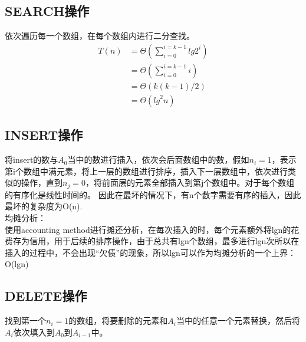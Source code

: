 \documentclass[UTF8]{ctexart}
\begin{document}
\subsection{SEARCH操作}
依次遍历每一个数组，在每个数组内进行二分查找。
\begin{align*}
    T(n)    &=  \Theta  (\sum_{i = 0}^{i = k-1}lg2^i )  \\  
            &=  \Theta  (\sum_{i = 0}^{i = k-1}i ) \\
            &= \Theta  (k(k-1)/2)\\
            &= \Theta({lg}^2n)
\end{align*}

\subsection{INSERT操作}
将insert的数与$A_0$当中的数进行插入，依次会后面数组中的数，假如$n_i=1$，表示第i个数组中满元素，将上一层的数组进行排序，插入下一层数组中，依次进行类似的操作，直到$n_j = 0$，将前面层的元素全部插入到第j个数组中。对于每个数组的有序化是线性时间的。
因此在最坏的情况下，有n个数字需要有序的插入，因此最坏的复杂度为O(n).\\

均摊分析：\\
使用accounting method进行摊还分析，在每次插入的时，每个元素额外将lgn的花费存为信用，用于后续的排序操作，由于总共有lgn个数组，最多进行lgn次所以在插入的过程中，不会出现“欠债”的现象，所以lgn可以作为均摊分析的一个上界：O(lgn)

\subsection{DELETE操作}
找到第一个$n_i=1$的数组，将要删除的元素和$A_i$当中的任意一个元素替换，然后将$A_i$依次填入到$A_0$到$A_{i-1}$中。
\end{document}

